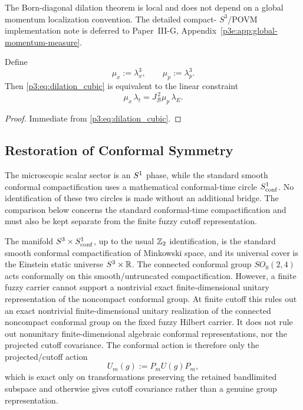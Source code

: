 \documentclass[12pt,a4paper]{article}
\begin{document}
\begin{remark}
The Born-diagonal dilation theorem is local and does not depend on a global momentum
localization convention.  The detailed compact-
\(S^3\)/POVM implementation note is deferred to
Paper~III-G, Appendix~\ref{p3e:app:global-momentum-measure}.
\end{remark}

\begin{corollary}
\hfill \newline
\label{p3:cor:dilation_linear}
Define
\[
\mu_x:=\lambda_x^{3},\qquad \mu_p:=\lambda_p^{3}.
\]
Then \eqref{p3:eq:dilation_cubic} is equivalent to the linear constraint
\[
\boxed{\ \mu_x\,\lambda_t
       =J_{\mathcal B}^{\,2}\mu_p\,\lambda_E.\ }
\]
\end{corollary}

\begin{proof}
Immediate from \eqref{p3:eq:dilation_cubic}.
\end{proof}


\subsection{Restoration of Conformal Symmetry}
\label{p3:subsec:conformal-restoration}

The microscopic scalar sector is an \(S^1\) phase, while the standard smooth
conformal compactification uses a mathematical conformal-time circle
\(S^1_{\rm conf}\).  No identification of these two circles is made without an
additional bridge.  The comparison below concerns the standard conformal-time
compactification and must also be kept separate from the finite fuzzy cutoff
representation.

\begin{theorem}
\label{p3:thm:conformal-compactification-cutoff}
The manifold \(S^3\times S^1_{\rm conf}\), up to the usual \(\mathbb{Z}_2\) identification, is the standard smooth conformal compactification of Minkowski space, and its universal cover is the Einstein static universe \(S^3\times\mathbb{R}\).  The connected conformal group \(SO_0(2,4)\) acts conformally on this smooth/untruncated compactification.  However, a finite fuzzy carrier cannot support a nontrivial exact finite-dimensional unitary representation of the noncompact conformal group.  At finite cutoff this rules out an exact nontrivial finite-dimensional unitary realization of the connected noncompact conformal group on the fixed fuzzy Hilbert carrier. It does not rule out nonunitary finite-dimensional algebraic conformal representations, nor the projected cutoff covariance. The conformal action is therefore only the projected/cutoff action
\begin{equation}
\label{p3:eq:projected-conformal-action}
        U_m(g):=P_mU(g)P_m,
\end{equation}
which is exact only on transformations preserving the retained bandlimited subspace and otherwise gives cutoff covariance rather than a genuine group representation.
\end{theorem}
\end{document}
